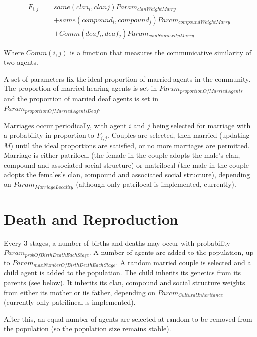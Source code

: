 \documentclass[11pt, oneside]{article}
\begin{document}
\begin{equation}
\begin{aligned}
F_{i,j} = & same(clan_{i}, clan{j})Param_{clanWeightMarry}   \\
	& + same(compound_i,compound_j)Param_{compoundWeightMarry}  \\
	& + Comm(deaf_i,deaf_j)Param_{comSimilarityMarry}
\end{aligned}
\end{equation}

Where $Comm(i,j)$ is a function that measures the communicative similarity of two agents.

A set of parameters fix the ideal proportion of married agents in the community.  The proportion of married hearing agents is set in $Param_{proportionOfMarriedAgents}$ and the proportion of married deaf agents is set in $Param_{proportionOfMarriedAgentsDeaf}$.

Marriages occur periodically, with agent $i$ and $j$ being selected for marriage with a probability in proportion to $F_{i,j}$.  Couples are selected, then married (updating $M$) until the ideal proportions are satisfied, or no more marriages are permitted.  Marriage is either patrilocal (the female in the couple adopts the male's clan, compound and associated social structure) or matrilocal (the male in the couple adopts the females's clan, compound and associated social structure), depending on $Param_{MarriageLocality}$ (although only patrilocal is implemented, currently).



\section{Death and Reproduction}

Every 3 stages, a number of births and deaths may occur with probability $Param_{probOfBirthDeathEachStage}$.  A number of agents are added to the population, up to $Param_{maxNumberOfBirthDeathEachStage}$.  A random married couple is selected and a child agent is added to the population.  The child inherits its genetics from its parents (see below).  It inherits its clan, compound and social structure weights from either its mother or its father, depending on $Param_{CulturalInheritance}$ (currently only patrilineal is implemented).

After this, an equal number of agents are selected at random to be removed from the population (so the population size remains stable).
\end{document}
